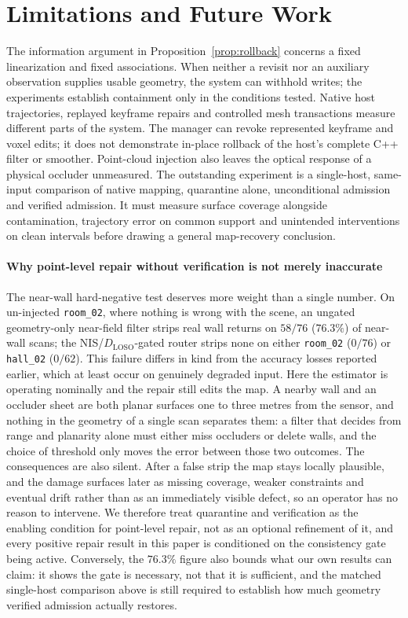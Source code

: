 \documentclass[journal]{IEEEtran}
\begin{document}
\section{Limitations and Future Work}
The information argument in Proposition~\ref{prop:rollback} concerns a fixed linearization and fixed associations. When neither a revisit nor an auxiliary observation supplies usable geometry, the system can withhold writes; the experiments establish containment only in the conditions tested. Native host trajectories, replayed keyframe repairs and controlled mesh transactions measure different parts of the system. The manager can revoke represented keyframe and voxel edits; it does not demonstrate in-place rollback of the host's complete C++ filter or smoother. Point-cloud injection also leaves the optical response of a physical occluder unmeasured. The outstanding experiment is a single-host, same-input comparison of native mapping, quarantine alone, unconditional admission and verified admission. It must measure surface coverage alongside contamination, trajectory error on common support and unintended interventions on clean intervals before drawing a general map-recovery conclusion.

\paragraph{Why point-level repair without verification is not merely inaccurate}
The near-wall hard-negative test deserves more weight than a single number. On un-injected \texttt{room\_02}, where nothing is wrong with the scene, an ungated geometry-only near-field filter strips real wall returns on $58/76$ ($76.3\%$) of near-wall scans; the NIS/$D_{\mathrm{LOSO}}$-gated router strips none on either \texttt{room\_02} ($0/76$) or \texttt{hall\_02} ($0/62$). This failure differs in kind from the accuracy losses reported earlier, which at least occur on genuinely degraded input. Here the estimator is operating nominally and the repair still edits the map. A nearby wall and an occluder sheet are both planar surfaces one to three metres from the sensor, and nothing in the geometry of a single scan separates them: a filter that decides from range and planarity alone must either miss occluders or delete walls, and the choice of threshold only moves the error between those two outcomes. The consequences are also silent. After a false strip the map stays locally plausible, and the damage surfaces later as missing coverage, weaker constraints and eventual drift rather than as an immediately visible defect, so an operator has no reason to intervene. We therefore treat quarantine and verification as the enabling condition for point-level repair, not as an optional refinement of it, and every positive repair result in this paper is conditioned on the consistency gate being active. Conversely, the $76.3\%$ figure also bounds what our own results can claim: it shows the gate is necessary, not that it is sufficient, and the matched single-host comparison above is still required to establish how much geometry verified admission actually restores.
\end{document}
